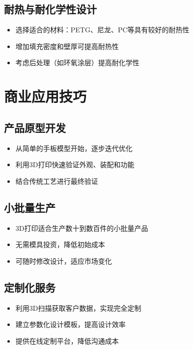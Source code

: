 \documentclass[12pt,UTF8]{ctexbook}
\begin{document}
\subsection{耐热与耐化学性设计}
\begin{itemize}
\item 选择适合的材料：PETG、尼龙、PC等具有较好的耐热性
\item 增加填充密度和壁厚可提高耐热性
\item 考虑后处理（如环氧涂层）提高耐化学性
\end{itemize}

\section{商业应用技巧}

\subsection{产品原型开发}
\begin{itemize}
\item 从简单的手板模型开始，逐步迭代优化
\item 利用3D打印快速验证外观、装配和功能
\item 结合传统工艺进行最终验证
\end{itemize}

\subsection{小批量生产}
\begin{itemize}
\item 3D打印适合生产数十到数百件的小批量产品
\item 无需模具投资，降低初始成本
\item 可随时修改设计，适应市场变化
\end{itemize}

\subsection{定制化服务}
\begin{itemize}
\item 利用3D扫描获取客户数据，实现完全定制
\item 建立参数化设计模板，提高设计效率
\item 提供在线定制平台，降低沟通成本
\end{itemize}
\end{document}
